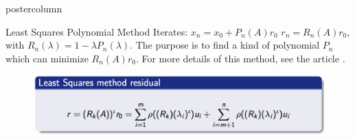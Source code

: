 \documentclass{beamer}
\newlength{\columnheight}
\begin{document}
\begin{frame}
\begin{columns}
	\begin{column}{.33\textwidth}
		\begin{beamercolorbox}[center]{postercolumn}
			\begin{minipage}{.98\textwidth} %
				\parbox[t][\columnheight]{\textwidth}{ %
					\begin{myblock}{Least Squares Polynomial Method}
					Iterates: $x_n=x_0+P_n(A)r_0$ \rightarrow $r_n=R_n(A)r_0$, with $R_n(\lambda)=1-\lambda P_n(\lambda)$. 
					The purpose is to find a kind of polynomial $P_n$ which can minimize $R_n(A)r_0$. For more details of this method, see the article \cite{saad1987least}.

					\vspace{.3em}
					\begin{figure}
							\begin{minipage}{.60\textwidth}
								\centering\includegraphics[width=\textwidth]{img/residu.png}
							\end{minipage}
					\end{figure}


\end{myblock}}
\end{minipage}
\end{beamercolorbox}
\end{column}
\end{columns}
\end{frame}
\end{document}
